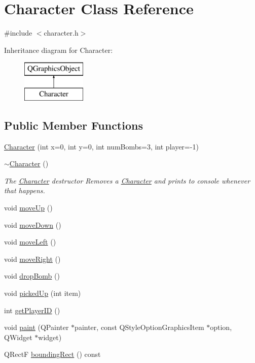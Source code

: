 \hypertarget{class_character}{\section{Character Class Reference}
\label{class_character}
}


{\ttfamily \#include $<$character.\-h$>$}

Inheritance diagram for Character\-:\begin{figure}[H]
\begin{center}
\leavevmode
\includegraphics[height=2.000000cm]{class_character}
\end{center}
\end{figure}
\subsection*{Public Member Functions}
\begin{DoxyCompactItemize}
\item 
\hyperlink{class_character_ade1bb6dc548f73fb814702776457a1f3}{Character} (int x=0, int y=0, int num\-Bombs=3, int player=-\/1)
\item 
\hyperlink{class_character_a9e9be564d05ded80962b2045aa70b3fc}{$\sim$\-Character} ()
\begin{DoxyCompactList}\small\item\em The \hyperlink{class_character}{Character} destructor Removes a \hyperlink{class_character}{Character} and prints to console whenever that happens. \end{DoxyCompactList}\item 
void \hyperlink{class_character_a5e63747ea61305391cd0ada0898e485c}{move\-Up} ()
\item 
void \hyperlink{class_character_afa7763e81bca6a0b9b0c044f39c429f0}{move\-Down} ()
\item 
void \hyperlink{class_character_a88dfc867ab226d3f115b891fc3b34d67}{move\-Left} ()
\item 
void \hyperlink{class_character_a0a8bf66e3d70c196a0fa8ce183f4aeb4}{move\-Right} ()
\item 
void \hyperlink{class_character_a38747fb2a1e186e6cc871f0836eb83e8}{drop\-Bomb} ()
\item 
void \hyperlink{class_character_acb99685904de8dce448ad8a51efed7cb}{picked\-Up} (int item)
\item 
int \hyperlink{class_character_aacb2a15ce71f1165daceb29cf481a4cb}{get\-Player\-I\-D} ()
\item 
void \hyperlink{class_character_a099916c7331625461d7cd976ec4b0498}{paint} (Q\-Painter $\ast$painter, const Q\-Style\-Option\-Graphics\-Item $\ast$option, Q\-Widget $\ast$widget)
\item 
Q\-Rect\-F \hyperlink{class_character_af3bf8c7fe7ddbad47b54193374d25ee2}{bounding\-Rect} () const 
\end{DoxyCompactItemize}


